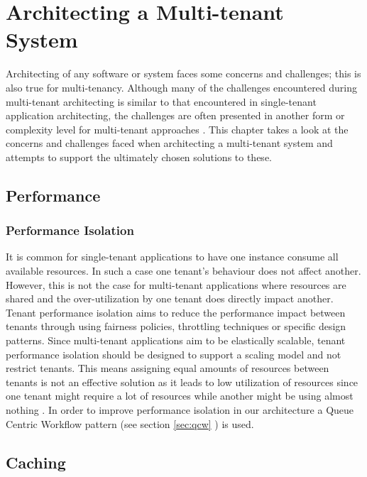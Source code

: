 \chapter{Architecting a Multi-tenant System}

Architecting of any software or system faces some concerns and challenges; this is also true for multi-tenancy. Although many of the challenges encountered during multi-tenant architecting is similar to that encountered in single-tenant application architecting, the challenges are often presented in another form or complexity level for multi-tenant approaches \cite{Bezemer:2010:MSA:1862372.1862393}. This chapter takes a look at the concerns and challenges faced when architecting a multi-tenant system and attempts to support the ultimately chosen solutions to these.


\section{Performance}
\subsection{Performance Isolation}

It is common for single-tenant applications to have one instance consume all available resources. In such a case one tenant's behaviour does not affect another. However, this is not the case for multi-tenant applications where resources are shared and the over-utilization by one tenant does directly impact another. Tenant performance isolation aims to reduce the performance impact between tenants through using fairness policies, throttling techniques or specific design patterns. Since multi-tenant applications aim to be elastically scalable, tenant performance isolation should be designed to support a scaling model and not restrict tenants. This means assigning equal amounts of resources between tenants is not an effective solution as it leads to low utilization of resources since one tenant might require a lot of resources while another might be using almost nothing \cite{Bezemer:2010:MSA:1862372.1862393}. In order to improve performance isolation in our architecture a Queue Centric Workflow pattern (see section \ref{sec:qcw} ) \cite{Wilder2012-so} is used.

\section{Caching}

